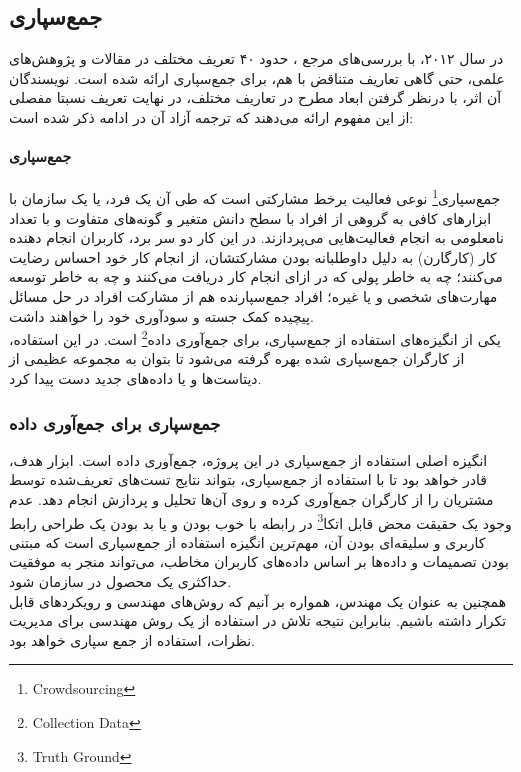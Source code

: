 \documentclass{article}
\theoremstyle{definition}
\begin{document}
\subsection{جمع‌سپاری}
در سال ۲۰۱۲، با بررسی‌های مرجع 
\cite{estelle}
، حدود ۴۰ تعریف مختلف در مقالات و پژوهش‌های علمی، حتی گاهی تعاریف متناقض با هم، برای جمع‌سپاری ارائه شده است. نویسندگان آن اثر، با درنظر گرفتن ابعاد مطرح در تعاریف مختلف، در نهایت تعریف نسبتا مفصلی از این مفهوم ارائه می‌دهند که ترجمه آزاد آن در ادامه ذکر شده است: \\
\paragraph{جمع‌سپاری}
جمع‌سپاری\footnote{Crowdsourcing}
نوعی فعالیت برخط مشارکتی است که طی آن یک فرد، یا یک سازمان با ابزارهای کافی به گروهی از افراد با سطح دانش متغیر و گونه‌های متفاوت و با تعداد نامعلومی به انجام فعالیت‌هایی می‌پردازند. در این کار دو سر برد، کاربران انجام دهنده کار (کارگارن)  به دلیل داوطلبانه بودن مشارکتشان، از انجام کار خود احساس رضایت می‌کنند؛ چه به خاطر پولی که در ازای انجام کار دریافت می‌کنند و چه به خاطر توسعه مهارت‌های شخصی و یا غیره؛ افراد جمع‌سپارنده هم از مشارکت افراد در حل مسائل پیچیده کمک جسته و سودآوری خود را خواهند داشت. \\
یکی از انگیزه‌های استفاده از جمع‌سپاری، برای جمع‌آوری داده\footnote{Collection Data} است. در این استفاده، از کارگران جمع‌سپاری شده بهره گرفته می‌شود تا بتوان به مجموعه عظیمی از دیتاست‌ها و یا داده‌های جدید دست پیدا کرد.
\subsubsection{جمع‌سپاری برای جمع‌آوری داده}
انگیزه اصلی استفاده از جمع‌سپاری در این پروژه، جمع‌آوری داده است. ابزار هدف، قادر خواهد بود تا با استفاده از جمع‌سپاری، بتواند نتایج تست‌های تعریف‌شده توسط مشتریان را از کارگران جمع‌آوری کرده و روی آن‌ها تحلیل و پردازش انجام دهد. عدم وجود یک حقیقت محض قابل اتکا\footnote{Truth Ground} در رابطه با خوب بودن و یا بد بودن یک طراحی رابط کاربری و سلیقه‌ای بودن آن، مهم‌ترین انگیزه استفاده از جمع‌سپاری است که مبتنی بودن تصمیمات و داده‌ها بر اساس داده‌های کاربران مخاطب، می‌تواند منجر به موفقیت حداکثری یک محصول در سازمان شود.\\
همچنین به عنوان یک مهندس، همواره بر آنیم که روش‌های مهندسی و رویکردهای قابل تکرار داشته باشیم. بنابراین نتیجه تلاش در استفاده از یک روش مهندسی برای مدیریت نظرات، استفاده از جمع سپاری خواهد بود.
\newpage
\end{document}
